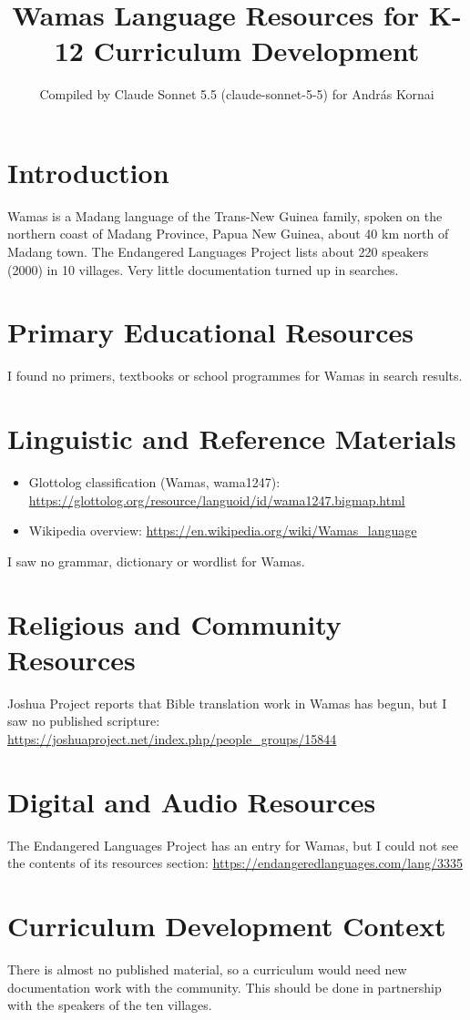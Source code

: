 \documentclass[12pt]{article}
\title{Wamas Language Resources for K-12 Curriculum Development}
\author{Compiled by Claude Sonnet 5.5 (claude-sonnet-5-5) for Andr\'as Kornai}
\date{}
\begin{document}
\maketitle

\section{Introduction}
Wamas is a Madang language of the Trans-New Guinea family, spoken on the northern coast of Madang Province, Papua New Guinea, about 40 km north of Madang town. The Endangered Languages Project lists about 220 speakers (2000) in 10 villages. Very little documentation turned up in searches.

\section{Primary Educational Resources}
I found no primers, textbooks or school programmes for Wamas in search results.

\section{Linguistic and Reference Materials}
\begin{itemize}
\item Glottolog classification (Wamas, wama1247): \url{https://glottolog.org/resource/languoid/id/wama1247.bigmap.html}
\item Wikipedia overview: \url{https://en.wikipedia.org/wiki/Wamas_language}
\end{itemize}
I saw no grammar, dictionary or wordlist for Wamas.

\section{Religious and Community Resources}
Joshua Project reports that Bible translation work in Wamas has begun, but I saw no published scripture: \url{https://joshuaproject.net/index.php/people_groups/15844}

\section{Digital and Audio Resources}
The Endangered Languages Project has an entry for Wamas, but I could not see the contents of its resources section: \url{https://endangeredlanguages.com/lang/3335}

\section{Curriculum Development Context}
There is almost no published material, so a curriculum would need new documentation work with the community. This should be done in partnership with the speakers of the ten villages.
\end{document}
